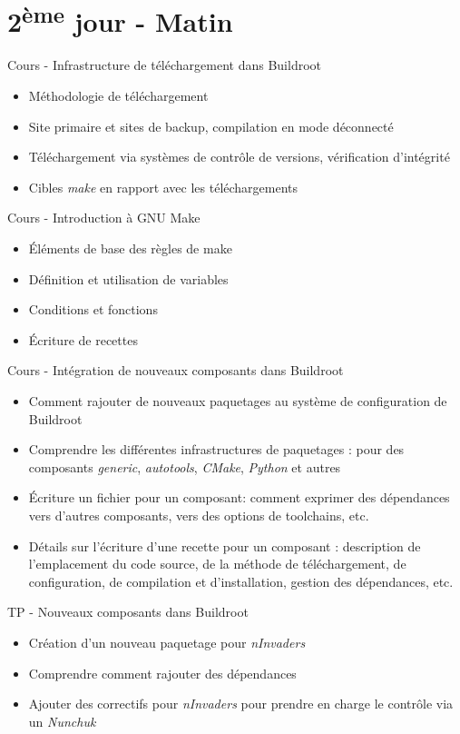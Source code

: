 \documentclass[a4paper,12pt,obeyspaces,spaces,hyphens]{article}
\begin{document}
\section{2\textsuperscript{ème} jour - Matin}

\feagendatwocolumn
{Cours - Infrastructure de téléchargement dans Buildroot}
{
  \begin{itemize}
  \item Méthodologie de téléchargement
  \item Site primaire et sites de backup, compilation en mode déconnecté
  \item Téléchargement via systèmes de contrôle de versions,
	vérification d'intégrité
  \item Cibles {\em make} en rapport avec les téléchargements
  \end{itemize}
}
{Cours - Introduction à GNU Make}
{
  \begin{itemize}
  \item Éléments de base des règles de make
  \item Définition et utilisation de variables
  \item Conditions et fonctions
  \item Écriture de recettes
  \end{itemize}
}

\feagendatwocolumn
{Cours - Intégration de nouveaux composants dans Buildroot}
{
  \begin{itemize}
  \item Comment rajouter de nouveaux paquetages au système de
	configuration de Buildroot
  \item Comprendre les différentes infrastructures de paquetages : pour
	des composants {\em generic}, {\em autotools}, {\em CMake}, {\em
	Python} et autres
  \item Écriture un fichier  pour un composant: comment
    exprimer des dépendances vers d'autres composants, vers des options
    de toolchains, etc.
  \item Détails sur l'écriture d'une recette pour un composant :
	description de l'emplacement du code source, de la méthode de
	téléchargement, de configuration, de compilation et
	d'installation, gestion des dépendances, etc. 
  \end{itemize}
}
{TP - Nouveaux composants dans Buildroot}
{
  \begin{itemize}
  \item Création d'un nouveau paquetage pour {\em nInvaders}
  \item Comprendre comment rajouter des dépendances
  \item Ajouter des correctifs pour {\em nInvaders} pour prendre en
	charge le contrôle via un {\em Nunchuk}
  \end{itemize}
}
\end{document}

